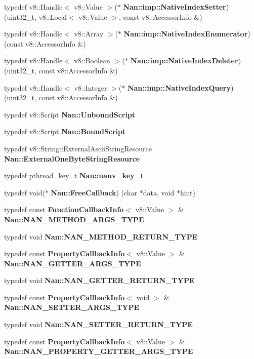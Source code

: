 \begin{DoxyCompactItemize}
\item 
typedef v8\+::\+Handle$<$ v8\+::\+Value $>$($\ast$ \textbf{ Nan\+::imp\+::\+Native\+Index\+Setter}) (uint32\+\_\+t, v8\+::\+Local$<$ v8\+::\+Value $>$, const v8\+::\+Accessor\+Info \&)
\item 
typedef v8\+::\+Handle$<$ v8\+::\+Array $>$($\ast$ \textbf{ Nan\+::imp\+::\+Native\+Index\+Enumerator}) (const v8\+::\+Accessor\+Info \&)
\item 
typedef v8\+::\+Handle$<$ v8\+::\+Boolean $>$($\ast$ \textbf{ Nan\+::imp\+::\+Native\+Index\+Deleter}) (uint32\+\_\+t, const v8\+::\+Accessor\+Info \&)
\item 
typedef v8\+::\+Handle$<$ v8\+::\+Integer $>$($\ast$ \textbf{ Nan\+::imp\+::\+Native\+Index\+Query}) (uint32\+\_\+t, const v8\+::\+Accessor\+Info \&)
\item 
typedef v8\+::\+Script \textbf{ Nan\+::\+Unbound\+Script}
\item 
typedef v8\+::\+Script \textbf{ Nan\+::\+Bound\+Script}
\item 
typedef v8\+::\+String\+::\+External\+Ascii\+String\+Resource \textbf{ Nan\+::\+External\+One\+Byte\+String\+Resource}
\item 
typedef pthread\+\_\+key\+\_\+t \textbf{ Nan\+::nauv\+\_\+key\+\_\+t}
\item 
typedef void($\ast$ \textbf{ Nan\+::\+Free\+Callback}) (char $\ast$data, void $\ast$hint)
\item 
typedef const \textbf{ Function\+Callback\+Info}$<$ v8\+::\+Value $>$ \& \textbf{ Nan\+::\+N\+A\+N\+\_\+\+M\+E\+T\+H\+O\+D\+\_\+\+A\+R\+G\+S\+\_\+\+T\+Y\+PE}
\item 
typedef void \textbf{ Nan\+::\+N\+A\+N\+\_\+\+M\+E\+T\+H\+O\+D\+\_\+\+R\+E\+T\+U\+R\+N\+\_\+\+T\+Y\+PE}
\item 
typedef const \textbf{ Property\+Callback\+Info}$<$ v8\+::\+Value $>$ \& \textbf{ Nan\+::\+N\+A\+N\+\_\+\+G\+E\+T\+T\+E\+R\+\_\+\+A\+R\+G\+S\+\_\+\+T\+Y\+PE}
\item 
typedef void \textbf{ Nan\+::\+N\+A\+N\+\_\+\+G\+E\+T\+T\+E\+R\+\_\+\+R\+E\+T\+U\+R\+N\+\_\+\+T\+Y\+PE}
\item 
typedef const \textbf{ Property\+Callback\+Info}$<$ void $>$ \& \textbf{ Nan\+::\+N\+A\+N\+\_\+\+S\+E\+T\+T\+E\+R\+\_\+\+A\+R\+G\+S\+\_\+\+T\+Y\+PE}
\item 
typedef void \textbf{ Nan\+::\+N\+A\+N\+\_\+\+S\+E\+T\+T\+E\+R\+\_\+\+R\+E\+T\+U\+R\+N\+\_\+\+T\+Y\+PE}
\item 
typedef const \textbf{ Property\+Callback\+Info}$<$ v8\+::\+Value $>$ \& \textbf{ Nan\+::\+N\+A\+N\+\_\+\+P\+R\+O\+P\+E\+R\+T\+Y\+\_\+\+G\+E\+T\+T\+E\+R\+\_\+\+A\+R\+G\+S\+\_\+\+T\+Y\+PE}

\end{DoxyCompactItemize}
